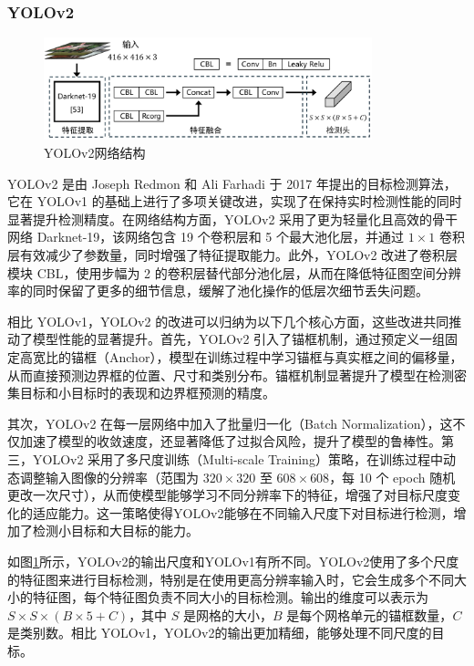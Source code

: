 \documentclass[11pt,twocolumn]{ctexart}
\begin{document}
\subsubsection{YOLOv2}

\begin{figure}[!hbtp]
  \begin{center}
  \includegraphics[width=0.85\textwidth]{YOLOv2结构图}
    \end{center}
  \caption{YOLOv2网络结构}
  \label{YOLOV2网络结构}
\end{figure}


YOLOv2\cite{redmon2017yolo9000} 是由 Joseph Redmon 和 Ali Farhadi 于 2017 年提出的目标检测算法，它在 YOLOv1 的基础上进行了多项关键改进，实现了在保持实时检测性能的同时显著提升检测精度。在网络结构方面，YOLOv2 采用了更为轻量化且高效的骨干网络 Darknet-19，该网络包含 19 个卷积层和 5 个最大池化层，并通过 $1 \times 1$ 卷积层有效减少了参数量，同时增强了特征提取能力。此外，YOLOv2 改进了卷积层模块 CBL，使用步幅为 2 的卷积层替代部分池化层，从而在降低特征图空间分辨率的同时保留了更多的细节信息，缓解了池化操作的低层次细节丢失问题。

相比 YOLOv1，YOLOv2 的改进可以归纳为以下几个核心方面，这些改进共同推动了模型性能的显著提升。首先，YOLOv2 引入了锚框机制，通过预定义一组固定高宽比的锚框（Anchor），模型在训练过程中学习锚框与真实框之间的偏移量，从而直接预测边界框的位置、尺寸和类别分布。锚框机制显著提升了模型在检测密集目标和小目标时的表现和边界框预测的精度。

其次，YOLOv2 在每一层网络中加入了批量归一化（Batch Normalization），这不仅加速了模型的收敛速度，还显著降低了过拟合风险，提升了模型的鲁棒性。第三，YOLOv2 采用了多尺度训练（Multi-scale Training）策略，在训练过程中动态调整输入图像的分辨率（范围为 $320 \times 320$ 至 $608 \times 608$，每 10 个 epoch 随机更改一次尺寸），从而使模型能够学习不同分辨率下的特征，增强了对目标尺度变化的适应能力。这一策略使得YOLOv2能够在不同输入尺度下对目标进行检测，增加了检测小目标和大目标的能力。

如图\ref{YOLOV2网络结构}所示，YOLOv2的输出尺度和YOLOv1有所不同。YOLOv2使用了多个尺度的特征图来进行目标检测，特别是在使用更高分辨率输入时，它会生成多个不同大小的特征图，每个特征图负责不同大小的目标检测。输出的维度可以表示为 $S \times S \times (B \times 5 + C)$，其中 $S$ 是网格的大小，$B$ 是每个网格单元的锚框数量，$C$ 是类别数。相比 YOLOv1，YOLOv2的输出更加精细，能够处理不同尺度的目标。
\end{document}
